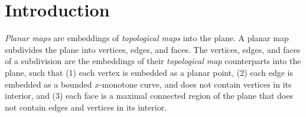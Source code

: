 
\def\Ipe#1{\def\IPEfile{#1}}

\renewcommand{\Re}{{\rm I\!\hspace{-0.025em} R}}

\def\C{{\cal C}}
\def\G{{\cal G}}
\def\F{{\cal F}}
\def\I{{\cal I}}
\def\U{{\cal U}}
\def\M{{\cal M}}
\def\eps{{\varepsilon}}
\def\bd{{\partial}}
\def\dm{{\cal D}}

\section{Introduction}
\label{PM_sec:intro}

{\em Planar maps} are embeddings of {\em topological maps} into the
plane. A planar map subdivides the plane into vertices, edges, and
faces. The vertices, edges, and faces of a subdivision are the
embeddings of their {\em topological map} counterparts into the plane,
such that (1) each vertex is embedded as a planar point, (2) each edge
is embedded as a bounded $x$-monotone curve, and does not contain
vertices in its interior, and (3) each face is a maximal connected
region of the plane that does not contain edges and vertices in its
interior.

